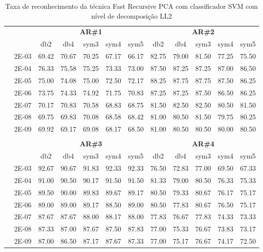 \begin{table}[H]
	\centering
    \normalsize
	\caption{Taxa de reconhecimento da técnica Fast Recursive PCA com classificador SVM com nível de decomposição LL2}
	\begin{tabular}{|c|c|c c c c c|c c c c c|}
\cline{3-12}
\multicolumn{2}{c|}{\multirow{2}{*}{}} & \multicolumn{5}{c|}{\textbf{AR\#1}}  & \multicolumn{5}{c|}{\textbf{AR\#2}} \\\cline{3-12}

\multicolumn{2}{c|}{}  & db2 & db4 & sym3 & sym4 & sym5 & db2 & db4& sym3 & sym4 & sym5 \\\hline
\multicolumn{1}{|c|}{ \multirow{6}{*}{\rotatebox[origin=c]{90}{\textbf{Gamma}}} }
&2E-03&	69.42&	70.67&	70.25&	67.17&	66.17&	82.75&	79.00&	81.50&	77.25&	75.50	\\\cline{2-12}
&2E-04&	76.33&	75.58&	75.25&	73.33&	73.00&	87.50&	87.25&	87.25&	87.00&	86.50	\\\cline{2-12}
&2E-05&	75.00&	74.08&	75.00&	72.50&	72.17&	88.25&	87.75&	87.75&	87.50&	86.25	\\\cline{2-12}
&2E-06&	73.75&	74.33&	74.92&	71.75&	70.83&	87.25&	87.25&	87.50&	86.50&	86.25	\\\cline{2-12}
&2E-07&	70.17&	70.83&	70.58&	68.83&	68.75&	81.50&	82.50&	82.50&	80.50&	81.50	\\\cline{2-12}
&2E-08&	69.75&	69.83&	70.08&	68.58&	68.42&	81.00&	80.50&	81.50&	79.75&	80.25	\\\cline{2-12}
&2E-09&	69.92&	69.17&	69.08&	68.17&	68.50&	81.00&	80.50&	80.50&	80.00&	80.50	

\\ \midrule
\multicolumn{12}{c}{}\\ 

\cline{3-12}
\multicolumn{2}{c}{} & \multicolumn{5}{|c|}{\textbf{AR\#3}}  & \multicolumn{5}{c|}{\textbf{AR\#4}} \\\cline{3-12}
\multicolumn{2}{c}{}  & \multicolumn{1}{|c}{db2} & db4 & sym3 & sym4 & sym5 & db2 & db4& sym3 & sym4 & sym5 \\\hline
\multicolumn{1}{|c|}{ \multirow{6}{*}{\rotatebox[origin=c]{90}{\textbf{Gamma}}} }
&2E-03&	92.67&	90.67&	91.83&	92.33&	92.33&	76.50&	72.83&	77.00&	69.50&	67.33	\\\cline{2-12}
&2E-04&	91.00&	90.50&	90.17&	91.50&	91.50&	81.33&	79.00&	80.50&	76.33&	75.33	\\\cline{2-12}
&2E-05&	89.50&	90.00&	89.83&	89.67&	89.17&	80.50&	79.33&	80.67&	76.17&	75.17	\\\cline{2-12}
&2E-06&	89.00&	89.00&	89.17&	88.50&	89.00&	80.50&	77.83&	80.67&	76.50&	75.17	\\\cline{2-12}
&2E-07&	87.67&	87.67&	88.00&	88.17&	88.00&	77.83&	76.67&	77.83&	74.33&	73.33	\\\cline{2-12}
&2E-08&	87.33&	87.00&	87.67&	87.50&	87.83&	77.00&	75.33&	76.67&	73.83&	73.17	\\\cline{2-12}
&2E-09&	87.00&	86.50&	87.17&	87.67&	87.33&	77.00&	75.17&	76.67&	74.17&	72.50	
	
\\\midrule
\end{tabular}

\end{table}
